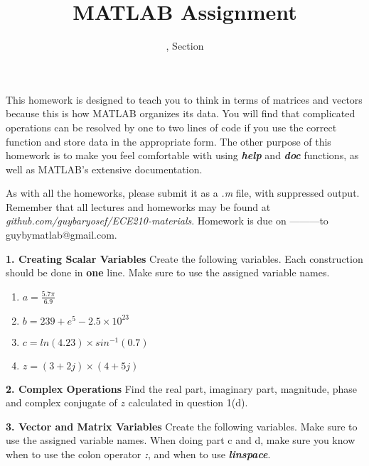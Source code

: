 \documentclass[11pt]{article}
\title{MATLAB Assignment \Homework}
\author{\Session, Section \Section}
\date{}
\makeatletter
\def\MyEmail{guybymatlab@gmail.com}
\def\DateOfSubmission{---------}
\newenvironment{qparts}{\begin{enumerate}[{(}a{)}]}{\end{enumerate}}
\makeatother
\begin{document}
\maketitle
This homework is designed to teach you to think in terms of matrices
and vectors because this is how MATLAB organizes its data. 
You will find that complicated operations can be resolved by one 
to two lines of code if you use the correct function and store data 
in the appropriate form. The other purpose of this homework is to make you feel comfortable
with using \textbf{\textit{help}} and \textbf{\textit{doc}} functions, 
as well as MATLAB's extensive documentation.

As with all the homeworks, please submit it as a \textit{.m} file, 
with suppressed output.
Remember that all lectures and homeworks may be found at 
\textit{github.com/guybaryosef/ECE210-materials}.
Homework is due on \DateOfSubmission to \MyEmail. 
\newline

\noindent \textbf{1. Creating Scalar Variables} 
Create the following variables. 
Each construction should be done in \textbf{one} line.
Make sure to use the assigned variable names. 
\begin{qparts}
\item
$ a = \frac{5.7 \pi}{6.9} $
\item 
$ b = 239+e^5 - 2.5 \times 10^{23}$
\item
$ c = ln(4.23) \times sin^{-1}(0.7)$
\item 
$ z = (3+2j) \times (4+5j) $

\end{qparts}

\noindent \textbf{2. Complex Operations} 
Find the real part, imaginary part, magnitude, 
phase and complex conjugate of $z$ calculated in question 1(d).

\noindent \textbf{3. Vector and Matrix Variables} 
Create the following variables. 
Make sure to use the assigned variable names. 
When doing part c and d, 
make sure you know when to use the colon operator \textbf{\textit{:}},
and when to use \textbf{\textit{linspace}}. 
\end{document}
